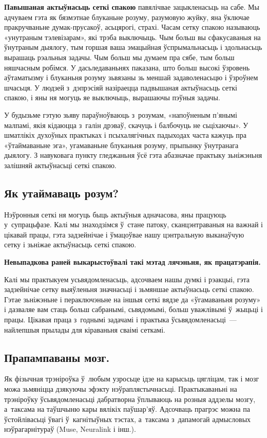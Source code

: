 \textbf{Павышаная актыўнасьць сеткі спакою} павялічвае зацыкленасьць на сабе. Мы адчуваем гэта як бязмэтнае блуканьне розуму, разумовую жуйку, яна ўключае пракручваньне думак-прусакоў, асьцярогі, страхі. Часам сетку спакою называюць «унутраным тэлевізарам», які трэба выключыць. Чым больш вы сфакусаваныя на ўнутраным дыялогу, тым горшая ваша эмацыйная ўспрымальнасьць і здольнасьць вырашаць рэальныя задачы. Чым больш мы думаем пра сябе, тым больш няшчасным робімся. У дасьледаваньнях паказана, што больш высокі ўзровень аўтаматызму і блуканьня розуму зьвязаны зь меншай задаволенасьцю і ўзроўнем шчасьця. У людзей з~дэпрэсіяй назіраецца падвышаная актыўнасьць сеткі спакою, і яны ня могуць яе выключыць, вырашаючы пэўныя задачы.

У будызьме гэтую зьяву параўноўваюць з~розумам, «напоўненым п'янымі малпамі, якія кідаюцца з~галін дрэваў, скачуць і балбочуць не сьціхаючы». У шматлікіх духоўных практыках і псыхалягічных падыходах часта кажуць пра «ўтаймаваньне эга», угамаваньне блуканьня розуму, прыпынку ўнутранага дыялогу. З навуковага пункту гледжаньня ўсё гэта абазначае практыку зьніжэньня залішняй актыўнасьці сеткі спакою.

\subsection*{Як утаймаваць розум?}

Нэўронныя сеткі ня могуць быць актыўныя адначасова, яны працуюць у~супрацьфазе. Калі мы знаходзімся ў~стане патоку, сканцэнтраваныя на важнай і цікавай працы, гэта задзейнічае і ўмацоўвае нашу цэнтральную выканаўчую сетку і зьніжае актыўнасьць сеткі спакою.

\textbf{Невыпадкова раней выкарыстоўвалі такі мэтад лячэньня, як працатэрапія.}

Калі мы практыкуем усьвядомленасьць, адсочваем нашы думкі і рэакцыі, гэта задзейнічае сетку выяўленьня значнасьці і зьмяншае актыўнасьць сеткі спакою. Гэтае зьніжэньне і пераключэньне на іншыя сеткі вядзе да «ўгамаваньня розуму» і дазваляе вам стаць больш сабранымі, сьвядомымі, больш уважлівымі ў~жыцьці і працы. Цікавая праца з~годнымі задачамі і практыка ўсьвядомленасьці~--- найлепшыя прылады для кіраваньня сваімі сеткамі.

\subsection*{Прапампаваны мозг.}

Як фізычная трэніроўка ў~любым узросьце ідзе на карысьць цягліцам, так і мозг можа зьмяніцца дзякуючы эфэкту нэўраплястычнасьці. Практыкаваньні на трэніроўку ўсьвядомленасьці дабратворна ўплываюць на розныя аддзелы мозгу, а~таксама на таўшчыню кары вялікіх паўшар'яў. Адсочваць прагрэс можна па ўстойлівасьці ўвагі ў~кагнітыўных тэстах, а~таксама з~дапамогай адмысловых нэўрагарнітураў (Muse, Neuralink і інш.).

